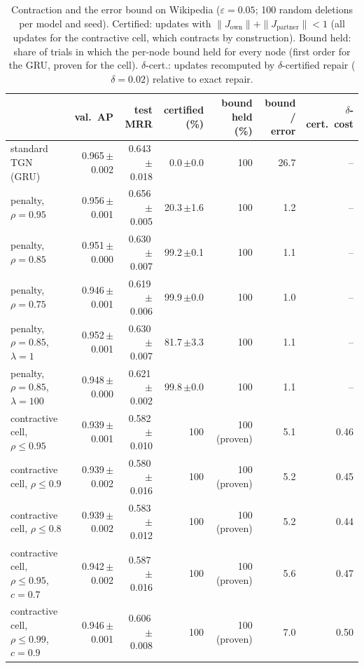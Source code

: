 \begin{table}[t]
\centering\scriptsize
\caption{Contraction and the error bound on Wikipedia ($\varepsilon=0.05$; 100 random deletions per model and seed). Certified:
updates with $\|J_{\text{own}}\|+\|J_{\text{partner}}\|<1$ (all updates for the contractive cell, which contracts by
construction). Bound held: share of trials in which the per-node bound held for every node (first order for the
GRU, proven for the cell). $\delta$-cert.: updates recomputed by $\delta$-certified repair ($\delta=0.02$) relative to exact repair.}
\label{tab:cert}
\setlength{\tabcolsep}{3pt}
\begin{tabular}{@{}lrrrrrr@{}}
\toprule
 & val.\ AP & test MRR & certified (\%) & bound held (\%) & bound / error & $\delta$-cert.\ cost \\
\midrule
standard TGN (GRU) & 0.965\,{\scriptsize$\pm$0.002} & 0.643\,{\scriptsize$\pm$0.018} & 0.0\,{\scriptsize$\pm$0.0} & 100 & 26.7 & -- \\
penalty, $\rho=0.95$ & 0.956\,{\scriptsize$\pm$0.001} & 0.656\,{\scriptsize$\pm$0.005} & 20.3\,{\scriptsize$\pm$1.6} & 100 & 1.2 & -- \\
penalty, $\rho=0.85$ & 0.951\,{\scriptsize$\pm$0.000} & 0.630\,{\scriptsize$\pm$0.007} & 99.2\,{\scriptsize$\pm$0.1} & 100 & 1.1 & -- \\
penalty, $\rho=0.75$ & 0.946\,{\scriptsize$\pm$0.001} & 0.619\,{\scriptsize$\pm$0.006} & 99.9\,{\scriptsize$\pm$0.0} & 100 & 1.0 & -- \\
penalty, $\rho=0.85$, $\lambda=1$ & 0.952\,{\scriptsize$\pm$0.001} & 0.630\,{\scriptsize$\pm$0.007} & 81.7\,{\scriptsize$\pm$3.3} & 100 & 1.1 & -- \\
penalty, $\rho=0.85$, $\lambda=100$ & 0.948\,{\scriptsize$\pm$0.000} & 0.621\,{\scriptsize$\pm$0.002} & 99.8\,{\scriptsize$\pm$0.0} & 100 & 1.1 & -- \\
contractive cell, $\rho\le0.95$ & 0.939\,{\scriptsize$\pm$0.001} & 0.582\,{\scriptsize$\pm$0.010} & 100 & 100 (proven) & 5.1 & 0.46 \\
contractive cell, $\rho\le0.9$ & 0.939\,{\scriptsize$\pm$0.002} & 0.580\,{\scriptsize$\pm$0.016} & 100 & 100 (proven) & 5.2 & 0.45 \\
contractive cell, $\rho\le0.8$ & 0.939\,{\scriptsize$\pm$0.002} & 0.583\,{\scriptsize$\pm$0.012} & 100 & 100 (proven) & 5.2 & 0.44 \\
contractive cell, $\rho\le0.95$, $c=0.7$ & 0.942\,{\scriptsize$\pm$0.002} & 0.587\,{\scriptsize$\pm$0.016} & 100 & 100 (proven) & 5.6 & 0.47 \\
contractive cell, $\rho\le0.99$, $c=0.9$ & 0.946\,{\scriptsize$\pm$0.001} & 0.606\,{\scriptsize$\pm$0.008} & 100 & 100 (proven) & 7.0 & 0.50 \\
\bottomrule
\end{tabular}
\end{table}
